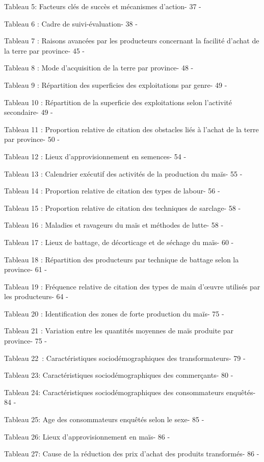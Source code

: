 \documentclass[12pt,oneside]{report}
\begin{document}
Tableau 5: Facteurs clés de succès et mécanismes d'action- 37 -

Tableau 6 : Cadre de suivi-évaluation- 38 -

Tableau 7 : Raisons avancées par les producteurs concernant la facilité d’achat de la terre par province- 45 -

Tableau 8 : Mode d’acquisition de la terre par province- 48 -

Tableau 9 : Répartition des superficies des exploitations par genre- 49 -

Tableau 10 : Répartition de la superficie des exploitations selon l’activité secondaire- 49 -

Tableau 11 : Proportion relative de citation des obstacles liés à l’achat de la terre par province- 50 -

Tableau 12 : Lieux d’approvisionnement en semences- 54 -

Tableau 13 : Calendrier exécutif des activités de la production du maïs- 55 -

Tableau 14 : Proportion relative de citation des types de labour- 56 -

Tableau 15 : Proportion relative de citation des techniques de sarclage- 58 -

Tableau 16 : Maladies et ravageurs du maïs et méthodes de lutte- 58 -

Tableau 17 : Lieux de battage, de décorticage et de séchage du maïs- 60 -

Tableau 18 : Répartition des producteurs par technique de battage selon la province- 61 -

Tableau 19 : Fréquence relative de citation des types de main d’œuvre utilisés par les producteurs- 64 -

Tableau 20 : Identification des zones de forte production du maïs- 75 -

Tableau 21 : Variation entre les quantités moyennes de maïs produite par province- 75 -

Tableau 22 : Caractéristiques sociodémographiques des transformateurs- 79 -

Tableau 23: Caractéristiques sociodémographiques des commerçants- 80 -

Tableau 24: Caractéristiques sociodémographiques des consommateurs enquêtés- 84 -

Tableau 25: Age des consommateurs enquêtés selon le sexe- 85 -

Tableau 26: Lieux d’approvisionnement en maïs- 86 -

Tableau 27: Cause de la réduction des prix d'achat des produits transformés- 86 -
\end{document}
